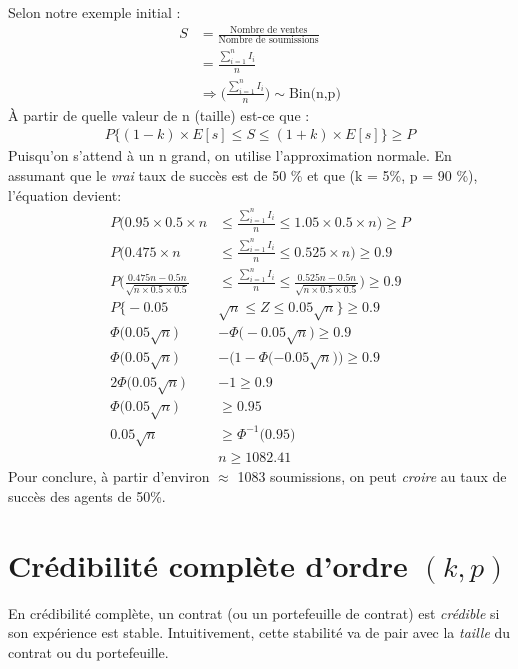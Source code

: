 Selon notre exemple initial :
\begin{align*}
S &= \frac{\text{Nombre de ventes}}{\text{Nombre de soumissions}} \\
&= \frac{\sum_{i = 1}^{n} I_{i}}{n} \\
& \Rightarrow \Bigg(\frac{\sum_{i = 1}^{n} I_{i}}{n} \Bigg) \sim \text{Bin(n,p)}
\end{align*}
À partir de quelle valeur de n (taille) est-ce que :
\begin{align*}
P \Big \lbrace(1 - k) \times E[s] \leq S \leq(1 + k)\times E[s]\Big\rbrace \geq P
\end{align*}
Puisqu'on s'attend à un n grand, on utilise l'approximation normale. En assumant que le \textit{vrai} taux de succès est de 50 \% et que (k = 5\%, p = 90 \%), l'équation devient:
\begin{align*}
P\Bigg(0.95 \times  0.5 \times  n &\leq \frac{\sum_{i = 1}^{n} I_{i}}{n} \leq 1.05 \times  0.5 \times  n \Bigg) \geq P\\
P\Bigg(0.475 \times  n &\leq \frac{\sum_{i = 1}^{n} I_{i}}{n} \leq 0.525 \times  n\Bigg) \geq0.9 \\
P\Bigg( \frac{0.475n - 0.5n}{\sqrt{n \times  0.5 \times 0.5}} &\leq \frac{\sum_{i = 1}^{n} I_{i}}{n} \leq \frac{0.525n - 0.5n}{\sqrt{n \times  0.5 \times 0.5}}\Bigg) \geq0.9 \\
P \Big \lbrace -0.05 &\sqrt{n} \leq Z \leq 0.05\sqrt{n} \Big \rbrace \geq 0.9 \\
\Phi \big (0.05 \sqrt{n}) &- \Phi\big (-0.05 \sqrt{n}\big) \geq0.9 \\
\Phi\big (0.05 \sqrt{n}\big) &- \Big(1 - \Phi(-0.05 \sqrt{n}\big)\Big) \geq0.9 \\
2 \Phi\big (0.05 \sqrt{n}\big) &- 1 \geq0.9 \\
\Phi\big (0.05 \sqrt{n}\big) & \geq 0.95 \\
0.05 \sqrt{n} & \geq \Phi^{-1}\big (0.95\big) \\
&n \geq 1082.41
\end{align*}
Pour conclure, à partir d'environ $\approx$ 1083  soumissions, on peut \textit{croire} au taux de succès des agents de 50\%.

\section{Crédibilité complète d'ordre $(k,p)$}
En crédibilité complète, un contrat (ou un portefeuille de contrat) est \emph{crédible} si son expérience est stable. Intuitivement, cette stabilité va de pair avec la \emph{taille} du contrat ou du portefeuille.

